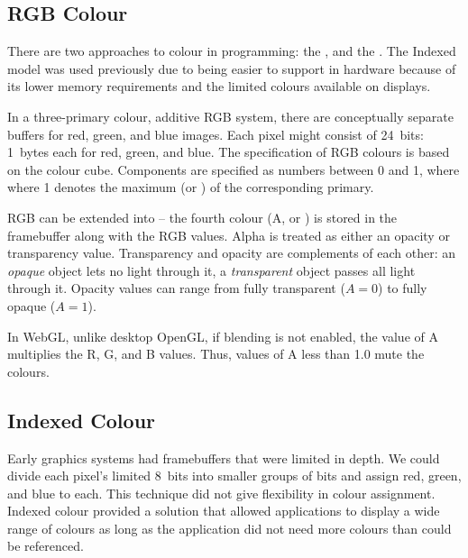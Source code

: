 \documentclass[../notes.tex]{subfiles}
\begin{document}
      \subsection{RGB Colour}
        There are two approaches to colour in programming: the ,
        and the .
        The Indexed model was used previously due to being easier to support in hardware
        because of its lower memory requirements and the limited colours available on displays.

        In a three-primary colour, additive RGB system, there are conceptually
        separate buffers for red, green, and blue images.
        Each pixel might consist of 24~bits: 1~bytes each for red, green, and blue.
        The specification of RGB colours is based on the colour cube.
        Components are specified as numbers between 0 and 1, where where 1 denotes the maximum
        (or ) of the corresponding primary.

        RGB can be extended into  -- the fourth colour (A, or )
        is stored in the framebuffer along with the RGB values.
        Alpha is treated as either an opacity or transparency value.
        Transparency and opacity are complements of each other:
        an \emph{opaque} object lets no light through it, a \emph{transparent} object
        passes all light through it.
        Opacity values can range from fully transparent ($A = 0$) to fully opaque ($A = 1$).

        In WebGL, unlike desktop OpenGL, if blending is not enabled,
        the value of A multiplies the R, G, and B values.
        Thus, values of A less than 1.0 mute the colours.

      \subsection{Indexed Colour}
        Early graphics systems had framebuffers that were limited in depth.
        We could divide each pixel's limited 8~bits into smaller groups of bits
        and assign red, green, and blue to each.
        This technique did not give flexibility in colour assignment.
        Indexed colour provided a solution that allowed applications to display a wide range
        of colours as long as the application did not need more colours than could be
        referenced.
\end{document}
